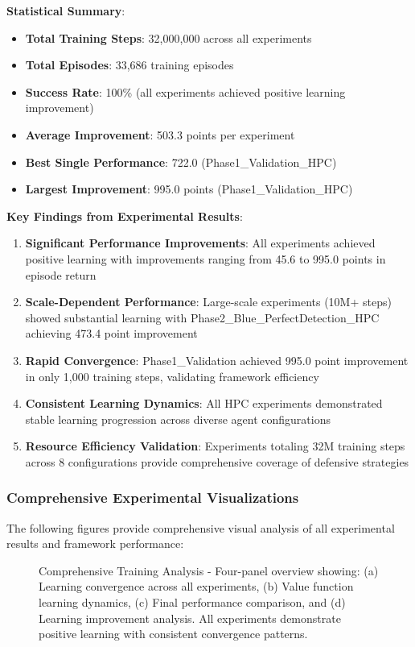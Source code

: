 \documentclass[11pt]{article}
\theoremstyle{definition}
\theoremstyle{plain}
\begin{document}
\textbf{Statistical Summary}:
\begin{itemize}
    \item \textbf{Total Training Steps}: 32,000,000 across all experiments
    \item \textbf{Total Episodes}: 33,686 training episodes
    \item \textbf{Success Rate}: 100\% (all experiments achieved positive learning improvement)
    \item \textbf{Average Improvement}: 503.3 points per experiment
    \item \textbf{Best Single Performance}: 722.0 (Phase1\_Validation\_HPC)
    \item \textbf{Largest Improvement}: 995.0 points (Phase1\_Validation\_HPC)
\end{itemize}

\textbf{Key Findings from Experimental Results}:
\begin{enumerate}
\item \textbf{Significant Performance Improvements}: All experiments achieved positive learning with improvements ranging from 45.6 to 995.0 points in episode return
\item \textbf{Scale-Dependent Performance}: Large-scale experiments (10M+ steps) showed substantial learning with Phase2\_Blue\_PerfectDetection\_HPC achieving 473.4 point improvement
\item \textbf{Rapid Convergence}: Phase1\_Validation achieved 995.0 point improvement in only 1,000 training steps, validating framework efficiency
\item \textbf{Consistent Learning Dynamics}: All HPC experiments demonstrated stable learning progression across diverse agent configurations
\item \textbf{Resource Efficiency Validation}: Experiments totaling 32M training steps across 8 configurations provide comprehensive coverage of defensive strategies
\end{enumerate}

\subsubsection{Comprehensive Experimental Visualizations}

The following figures provide comprehensive visual analysis of all experimental results and framework performance:

\begin{figure}[H]
\centering
\caption{Comprehensive Training Analysis - Four-panel overview showing: (a) Learning convergence across all experiments, (b) Value function learning dynamics, (c) Final performance comparison, and (d) Learning improvement analysis. All experiments demonstrate positive learning with consistent convergence patterns.}
\label{fig:comprehensive_analysis}
\end{figure}
\end{document}
